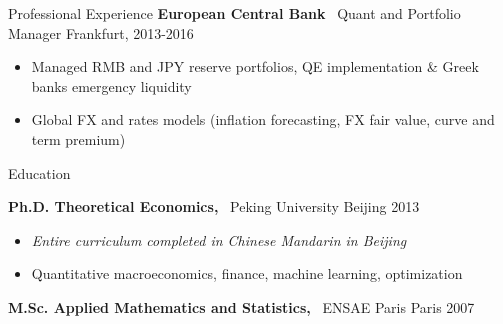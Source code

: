 \documentclass[usegeometry, 10pt, a4paper]{cv} %
\newcommand{\activite}[1]{\textbf{#1}\ }
\begin{document}
\begin{rubriquetableau}[0.95\textwidth]{Professional Experience}
\activite{European Central Bank} Quant and Portfolio Manager \hfill Frankfurt, 2013-2016 \\
\vspace{-0.2cm}

\begin{itemize}[]
  \item Managed RMB and JPY reserve portfolios, QE implementation \& Greek banks emergency liquidity
  \item Global FX and rates models (inflation forecasting, FX fair value, curve and term premium)
\end{itemize}
\end{rubriquetableau}

\begin{rubriquetableau}[0.95\textwidth]{Education}\\
  \vspace{-0.5cm}
  
  \activite{Ph.D. Theoretical Economics,} Peking University \hfill Beijing 2013\\ 
\vspace{-0.5cm}  
  \begin{itemize}[label={},
    rightmargin=\dimexpr\linewidth-13cm-\leftmargin\relax]
  \item \small{\emph{Entire curriculum completed in Chinese Mandarin in Beijing}}
  \item Quantitative macroeconomics, finance, machine learning, optimization
  \end{itemize}
  
  \vspace{0.2cm}
  
  \activite{M.Sc. Applied Mathematics and Statistics,} ENSAE Paris \hfill Paris 2007\\
  \vspace{0.2cm}
  \end{rubriquetableau}
\newpage

\end{document}
